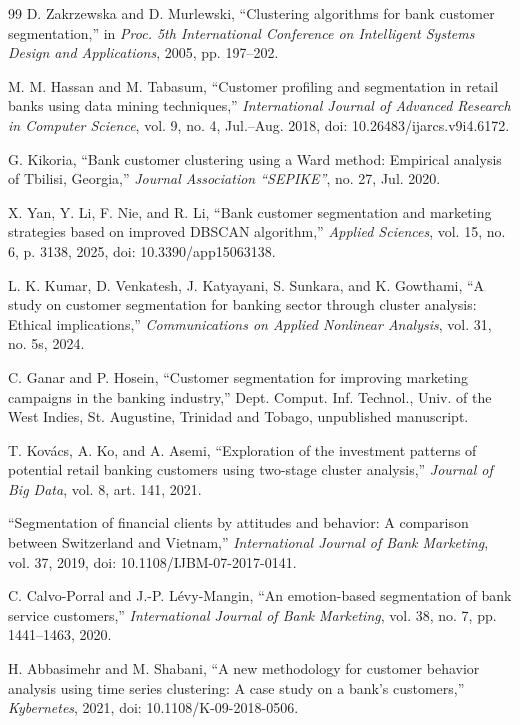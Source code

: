\documentclass[conference]{IEEEtran}
\begin{document}
\begin{thebibliography}{99}
D. Zakrzewska and D. Murlewski, ``Clustering algorithms for bank customer segmentation,'' in \textit{Proc. 5th International Conference on Intelligent Systems Design and Applications}, 2005, pp. 197--202.

M. M. Hassan and M. Tabasum, ``Customer profiling and segmentation in retail banks using data mining techniques,'' \textit{International Journal of Advanced Research in Computer Science}, vol. 9, no. 4, Jul.--Aug. 2018, doi: 10.26483/ijarcs.v9i4.6172.

G. Kikoria, ``Bank customer clustering using a Ward method: Empirical analysis of Tbilisi, Georgia,'' \textit{Journal Association ``SEPIKE''}, no. 27, Jul. 2020.

X. Yan, Y. Li, F. Nie, and R. Li, ``Bank customer segmentation and marketing strategies based on improved DBSCAN algorithm,'' \textit{Applied Sciences}, vol. 15, no. 6, p. 3138, 2025, doi: 10.3390/app15063138.

L. K. Kumar, D. Venkatesh, J. Katyayani, S. Sunkara, and K. Gowthami, ``A study on customer segmentation for banking sector through cluster analysis: Ethical implications,'' \textit{Communications on Applied Nonlinear Analysis}, vol. 31, no. 5s, 2024.

C. Ganar and P. Hosein, ``Customer segmentation for improving marketing campaigns in the banking industry,'' Dept. Comput. Inf. Technol., Univ. of the West Indies, St. Augustine, Trinidad and Tobago, unpublished manuscript.

T. Kov\'{a}cs, A. Ko, and A. Asemi, ``Exploration of the investment patterns of potential retail banking customers using two-stage cluster analysis,'' \textit{Journal of Big Data}, vol. 8, art. 141, 2021.

``Segmentation of financial clients by attitudes and behavior: A comparison between Switzerland and Vietnam,'' \textit{International Journal of Bank Marketing}, vol. 37, 2019, doi: 10.1108/IJBM-07-2017-0141.

C. Calvo-Porral and J.-P. L\'{e}vy-Mangin, ``An emotion-based segmentation of bank service customers,'' \textit{International Journal of Bank Marketing}, vol. 38, no. 7, pp. 1441--1463, 2020.

H. Abbasimehr and M. Shabani, ``A new methodology for customer behavior analysis using time series clustering: A case study on a bank's customers,'' \textit{Kybernetes}, 2021, doi: 10.1108/K-09-2018-0506.


\end{thebibliography}
\end{document}
